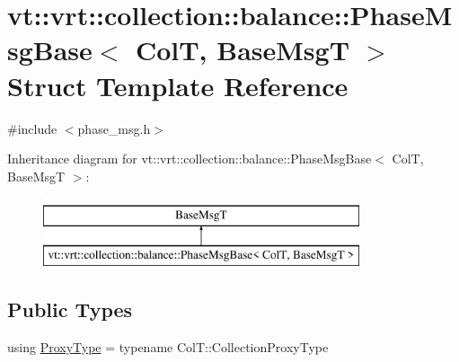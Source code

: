 \hypertarget{structvt_1_1vrt_1_1collection_1_1balance_1_1_phase_msg_base}{}\section{vt\+:\+:vrt\+:\+:collection\+:\+:balance\+:\+:Phase\+Msg\+Base$<$ ColT, Base\+MsgT $>$ Struct Template Reference}
\label{structvt_1_1vrt_1_1collection_1_1balance_1_1_phase_msg_base}


{\ttfamily \#include $<$phase\+\_\+msg.\+h$>$}

Inheritance diagram for vt\+:\+:vrt\+:\+:collection\+:\+:balance\+:\+:Phase\+Msg\+Base$<$ ColT, Base\+MsgT $>$\+:\begin{figure}[H]
\begin{center}
\leavevmode
\includegraphics[height=2.000000cm]{structvt_1_1vrt_1_1collection_1_1balance_1_1_phase_msg_base}
\end{center}
\end{figure}
\subsection*{Public Types}
\begin{DoxyCompactItemize}
\item 
using \hyperlink{structvt_1_1vrt_1_1collection_1_1balance_1_1_phase_msg_base_a21c9d10c5a8d1386f4e0a1bfa04f482f}{Proxy\+Type} = typename Col\+T\+::\+Collection\+Proxy\+Type
\end{DoxyCompactItemize}
